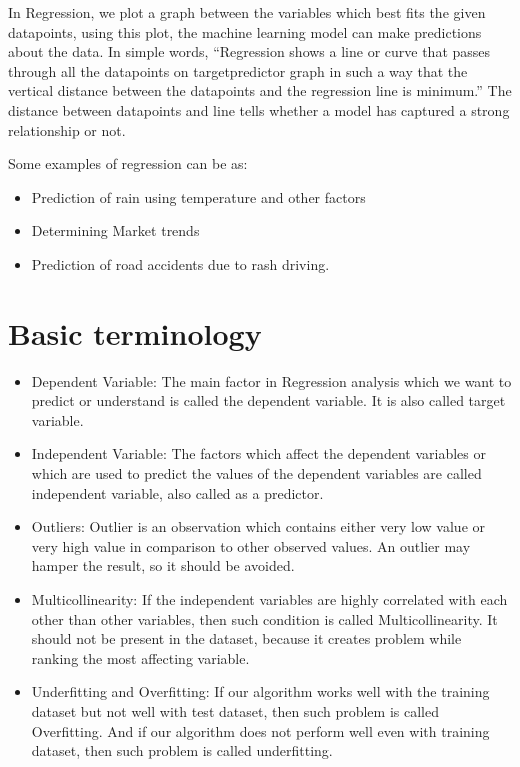 \documentclass[letterpaper,10pt,english]{sphinxmanual}
\begin{document}
\sphinxAtStartPar
In Regression, we plot a graph between the variables which best fits the given datapoints, using this plot, the machine learning model can make predictions about the data. In simple words, “Regression shows a line or curve that passes through all the datapoints on target\sphinxhyphen{}predictor graph in such a way that the vertical distance between the datapoints and the regression line is minimum.” The distance between datapoints and line tells whether a model has captured a strong relationship or not.

\sphinxAtStartPar
Some examples of regression can be as:
\begin{itemize}
\item {} 
\sphinxAtStartPar
Prediction of rain using temperature and other factors

\item {} 
\sphinxAtStartPar
Determining Market trends

\item {} 
\sphinxAtStartPar
Prediction of road accidents due to rash driving.

\end{itemize}


\section{Basic terminology}
\label{\detokenize{regression/regression:basic-terminology}}\begin{itemize}
\item {} 
\sphinxAtStartPar
Dependent Variable: The main factor in Regression analysis which we want to predict or understand is called the dependent variable. It is also called target variable.

\item {} 
\sphinxAtStartPar
Independent Variable: The factors which affect the dependent variables or which are used to predict the values of the dependent variables are called independent variable, also called as a predictor.

\item {} 
\sphinxAtStartPar
Outliers: Outlier is an observation which contains either very low value or very high value in comparison to other observed values. An outlier may hamper the result, so it should be avoided.

\item {} 
\sphinxAtStartPar
Multicollinearity: If the independent variables are highly correlated with each other than other variables, then such condition is called Multicollinearity. It should not be present in the dataset, because it creates problem while ranking the most affecting variable.

\item {} 
\sphinxAtStartPar
Underfitting and Overfitting: If our algorithm works well with the training dataset but not well with test dataset, then such problem is called Overfitting. And if our algorithm does not perform well even with training dataset, then such problem is called underfitting.

\end{itemize}
\end{document}
